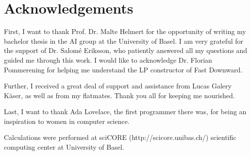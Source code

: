 \chapter{Acknowledgements}\label{ch:acknowledgments}
First, I want to thank Prof. Dr. Malte Helmert for the opportunity of writing my bachelor thesis in the AI group at the University of Basel.
I am very grateful for the support of Dr. Salom\'e Eriksson, who patiently answered all my questions and guided me through this work.
I would like to acknowledge Dr. Florian Pommerening for helping me understand the LP constructor of Fast Downward.


Further, I received a great deal of support and assistance from Lucas Galery K\"aser, as well as from my flatmates.
Thank you all for keeping me nourished.

Last, I want to thank Ada Lovelace, the first programmer there was, for being an inspiration to women in computer science.

Calculations were performed at sciCORE (http://scicore.unibas.ch/) scientific computing center at University of Basel.